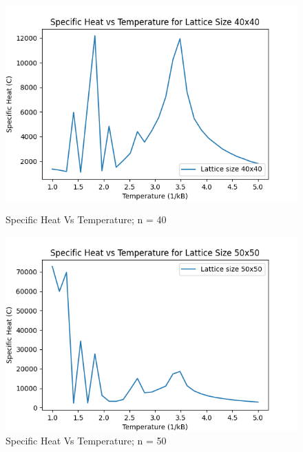 \documentclass[11pt]{article}
\begin{document}
\begin{figure}[H]
    \centering
    \begin{minipage}{0.48\textwidth}
        \centering
        \includegraphics[width=\textwidth]{Specific_Heat_vs_Temperature_n40.png}
        \caption{Specific Heat Vs Temperature; n = 40}
        \label{fig:25}
    \end{minipage}\hfill %
    \begin{minipage}{0.48\textwidth}
        \centering
        \includegraphics[width=\textwidth]{Specific_Heat_vs_Temperature_n50.png}
        \caption{Specific Heat Vs Temperature; n = 50}
        \label{fig:26}
    \end{minipage}
\end{figure}
\end{document}
